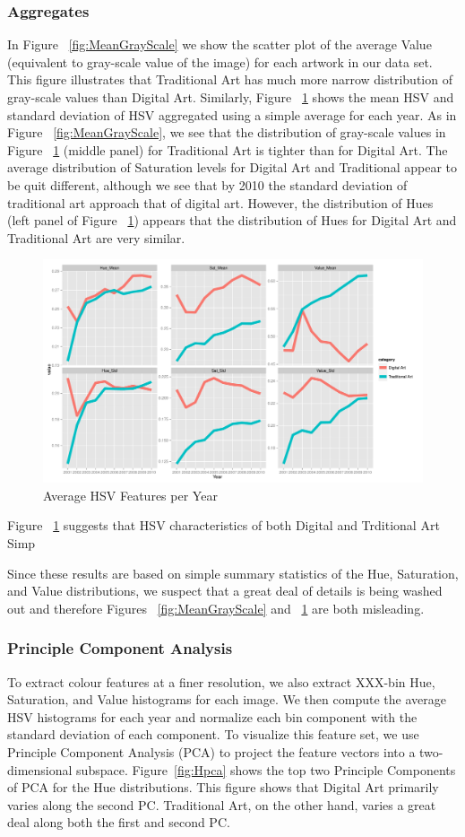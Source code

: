 \documentclass[letterpaper]{article}
\begin{document}
\subsubsection{Aggregates} In Figure ~\ref{fig:MeanGrayScale} we show the scatter plot of the average Value (equivalent to gray-scale value of the image) for each artwork in our data set. This figure illustrates that Traditional Art has much more narrow distribution of gray-scale values than Digital Art. Similarly, Figure ~\ref{fig:MeanHSV_yearly} shows the mean HSV and standard deviation of HSV aggregated using a simple average for each year. As in Figure ~\ref{fig:MeanGrayScale}, we see that the distribution of gray-scale values in Figure ~\ref{fig:MeanHSV_yearly} (middle panel) for Traditional Art is tighter than for Digital Art. The average distribution of Saturation levels for Digital Art and Traditional appear to be quit different, although we see that by 2010 the standard deviation of traditional art approach that of digital art. However, the distribution of Hues (left panel of Figure ~\ref{fig:MeanHSV_yearly}) appears that the distribution of Hues for Digital Art and Traditional Art are very similar. 

\begin{figure}
    \includegraphics[width = .5\textwidth]{hsv_time_2_cat}
      \caption{Average HSV Features per Year}
     \label{fig:MeanHSV_yearly}
\end{figure}

Figure ~\ref{fig:MeanHSV_yearly} suggests that HSV characteristics of both Digital and Trditional Art Simp

Since these results are based on simple summary statistics of the Hue, Saturation, and Value distributions, we suspect that a great deal of details is being washed out and therefore Figures ~\ref{fig:MeanGrayScale} and ~\ref{fig:MeanHSV_yearly} are both misleading. 

\subsubsection{Principle Component Analysis}
To extract colour features at a finer resolution, we also extract XXX-bin Hue, Saturation, and Value histograms for each image. We then compute the average HSV histograms for each year and normalize each bin component with the standard deviation of each component. To visualize this feature set, we use Principle Component Analysis (PCA) to project the feature vectors into a two-dimensional subspace. Figure~\ref{fig:Hpca} shows the top two Principle Components of PCA for the Hue distributions. This figure shows that Digital Art primarily varies along the second PC. Traditional Art, on the other hand, varies a great deal along both the first and second PC. 
\end{document}
